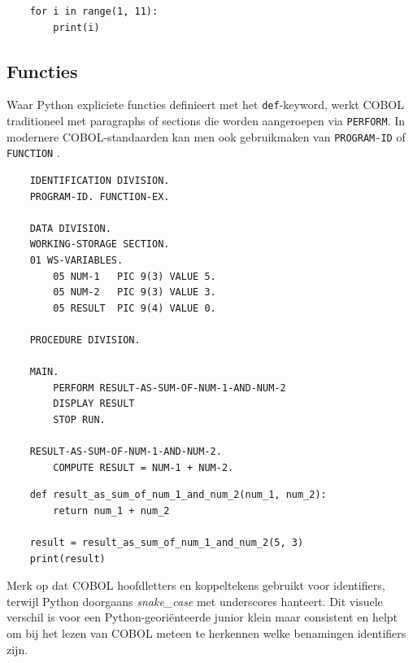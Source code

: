 \begin{listing}[H]
  \begin{verbatim}
    for i in range(1, 11):
        print(i)
  \end{verbatim}
  \caption[Iteratie in Python]{Iteratie in Python.}
  \label{lst:python_loop}
\end{listing}

\subsection{Functies}
Waar Python expliciete functies definieert met het \texttt{def}-keyword, werkt COBOL traditioneel met paragraphs of sections die worden aangeroepen via \texttt{PERFORM}. 
In modernere COBOL-standaarden kan men ook gebruikmaken van \texttt{PROGRAM-ID} of \texttt{FUNCTION} \autocite{IBM2023}.

\begin{listing}[H]
  \begin{verbatim}
    IDENTIFICATION DIVISION.
    PROGRAM-ID. FUNCTION-EX.

    DATA DIVISION.
    WORKING-STORAGE SECTION.
    01 WS-VARIABLES.
        05 NUM-1   PIC 9(3) VALUE 5.
        05 NUM-2   PIC 9(3) VALUE 3.
        05 RESULT  PIC 9(4) VALUE 0.

    PROCEDURE DIVISION.

    MAIN.
        PERFORM RESULT-AS-SUM-OF-NUM-1-AND-NUM-2
        DISPLAY RESULT
        STOP RUN.

    RESULT-AS-SUM-OF-NUM-1-AND-NUM-2.
        COMPUTE RESULT = NUM-1 + NUM-2.

  \end{verbatim}
  \caption[Functies in COBOL]{Functies in COBOL.}
  \label{lst:cobol_functie}
\end{listing}

\begin{listing}[H]
  \begin{verbatim}
    def result_as_sum_of_num_1_and_num_2(num_1, num_2):
        return num_1 + num_2

    result = result_as_sum_of_num_1_and_num_2(5, 3)
    print(result)
  \end{verbatim}
  \caption[Functie in Python]{Functie in Python.}
  \label{lst:python_functie}
\end{listing}

Merk op dat COBOL hoofdletters en koppeltekens gebruikt voor identifiers, terwijl Python doorgaans \emph{snake\_case} met underscores hanteert. Dit visuele verschil is voor een Python-georiënteerde junior klein maar consistent en helpt om bij het lezen van COBOL meteen te herkennen welke benamingen identifiers zijn.

